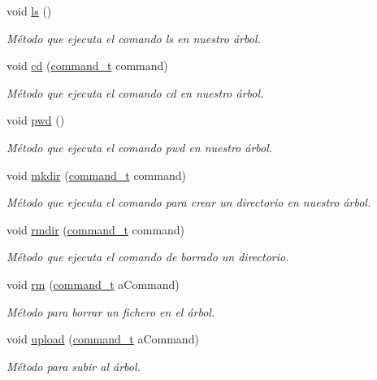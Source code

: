 \begin{DoxyCompactItemize}
void \hyperlink{classTerminal_a96f57c2e3dacbb0062ea098969d74223}{ls} ()
\begin{DoxyCompactList}\small\item\em Método que ejecuta el comando ls en nuestro árbol. \end{DoxyCompactList}\item 
void \hyperlink{classTerminal_af0648dba26e96c50ac5ea311cda505bc}{cd} (\hyperlink{structcommand__t}{command\+\_\+t} command)
\begin{DoxyCompactList}\small\item\em Método que ejecuta el comando cd en nuestro árbol. \end{DoxyCompactList}\item 
void \hyperlink{classTerminal_a5e3706157c23216bcde9a7b68a2f0663}{pwd} ()
\begin{DoxyCompactList}\small\item\em Método que ejecuta el comando pwd en nuestro árbol. \end{DoxyCompactList}\item 
void \hyperlink{classTerminal_accc2ad8c2abcfc1a01fafb6ad9e3c7ea}{mkdir} (\hyperlink{structcommand__t}{command\+\_\+t} command)
\begin{DoxyCompactList}\small\item\em Método que ejecuta el comando para crear un directorio en nuestro árbol. \end{DoxyCompactList}\item 
void \hyperlink{classTerminal_a95f79cc087e60f292ab95ae7950c40f9}{rmdir} (\hyperlink{structcommand__t}{command\+\_\+t} command)
\begin{DoxyCompactList}\small\item\em Método que ejecuta el comando de borrado un directorio. \end{DoxyCompactList}\item 
void \hyperlink{classTerminal_aa87d8e5d00abd8fc52d8c5e93439ae9a}{rm} (\hyperlink{structcommand__t}{command\+\_\+t} a\+Command)
\begin{DoxyCompactList}\small\item\em Método para borrar un fichero en el árbol. \end{DoxyCompactList}\item 
void \hyperlink{classTerminal_ac604ed511dcda771e720d9d746bb76d5}{upload} (\hyperlink{structcommand__t}{command\+\_\+t} a\+Command)
\begin{DoxyCompactList}\small\item\em Método para subir al árbol. \end{DoxyCompactList}\item 

\end{DoxyCompactItemize}

